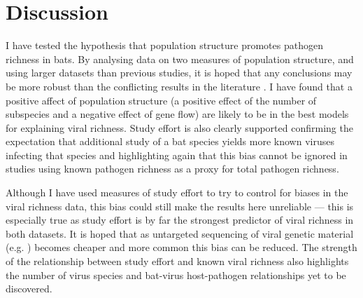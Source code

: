 
\section{Discussion}  



I have tested the hypothesis that population structure promotes pathogen richness in bats.
By analysing data on two measures of population structure, and using larger datasets than previous studies, it is hoped that any conclusions may be more robust than the conflicting results in the literature \cite{gay2014parasite, turmelle2009correlates, maganga2014bat}.
I have found that a positive affect of population structure (a positive effect of the number of subspecies and a negative effect of gene flow) are likely to be in the best models for explaining viral richness.
Study effort is also clearly supported confirming the expectation that additional study of a bat species yields more known viruses infecting that species and highlighting again that this bias cannot be ignored in studies using known pathogen richness as a proxy for total pathogen richness.



Although I have used measures of study effort to try to control for biases in the viral richness data, this bias could still make the results here unreliable --- this is especially true as study effort is by far the strongest predictor of viral richness in both datasets.
It is hoped that as untargeted sequencing of viral genetic material (e.g. \textcite{anthony2013strategy}) becomes cheaper and more common this bias can be reduced.
The strength of the relationship between study effort and known viral richness also highlights the number of virus species and bat-virus host-pathogen relationships yet to be discovered.

